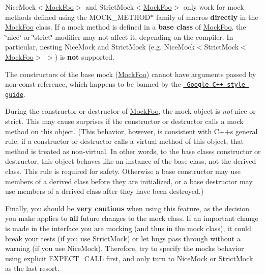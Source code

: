 \begin{DoxyEnumerate}
\item {\ttfamily Nice\+Mock$<$\mbox{\hyperlink{class_mock_foo}{Mock\+Foo}}$>$} and {\ttfamily Strict\+Mock$<$\mbox{\hyperlink{class_mock_foo}{Mock\+Foo}}$>$} only work for mock methods defined using the {\ttfamily M\+O\+C\+K\+\_\+\+M\+E\+T\+H\+O\+D$\ast$} family of macros {\bfseries{directly}} in the {\ttfamily \mbox{\hyperlink{class_mock_foo}{Mock\+Foo}}} class. If a mock method is defined in a {\bfseries{base class}} of {\ttfamily \mbox{\hyperlink{class_mock_foo}{Mock\+Foo}}}, the \char`\"{}nice\char`\"{} or \char`\"{}strict\char`\"{} modifier may not affect it, depending on the compiler. In particular, nesting {\ttfamily Nice\+Mock} and {\ttfamily Strict\+Mock} (e.\+g. {\ttfamily Nice\+Mock$<$Strict\+Mock$<$\mbox{\hyperlink{class_mock_foo}{Mock\+Foo}}$>$ $>$}) is {\bfseries{not}} supported.
\end{DoxyEnumerate}
\begin{DoxyEnumerate}
\item The constructors of the base mock ({\ttfamily \mbox{\hyperlink{class_mock_foo}{Mock\+Foo}}}) cannot have arguments passed by non-\/const reference, which happens to be banned by the \href{http://google-styleguide.googlecode.com/svn/trunk/cppguide.xml}\texttt{ Google C++ style guide}.
\end{DoxyEnumerate}
\begin{DoxyEnumerate}
\item During the constructor or destructor of {\ttfamily \mbox{\hyperlink{class_mock_foo}{Mock\+Foo}}}, the mock object is {\itshape not} nice or strict. This may cause surprises if the constructor or destructor calls a mock method on {\ttfamily this} object. (This behavior, however, is consistent with C++\textquotesingle{}s general rule\+: if a constructor or destructor calls a virtual method of {\ttfamily this} object, that method is treated as non-\/virtual. In other words, to the base class\textquotesingle{}s constructor or destructor, {\ttfamily this} object behaves like an instance of the base class, not the derived class. This rule is required for safety. Otherwise a base constructor may use members of a derived class before they are initialized, or a base destructor may use members of a derived class after they have been destroyed.)
\end{DoxyEnumerate}

Finally, you should be {\bfseries{very cautious}} when using this feature, as the decision you make applies to {\bfseries{all}} future changes to the mock class. If an important change is made in the interface you are mocking (and thus in the mock class), it could break your tests (if you use {\ttfamily Strict\+Mock}) or let bugs pass through without a warning (if you use {\ttfamily Nice\+Mock}). Therefore, try to specify the mock\textquotesingle{}s behavior using explicit {\ttfamily E\+X\+P\+E\+C\+T\+\_\+\+C\+A\+LL} first, and only turn to {\ttfamily Nice\+Mock} or {\ttfamily Strict\+Mock} as the last resort.

